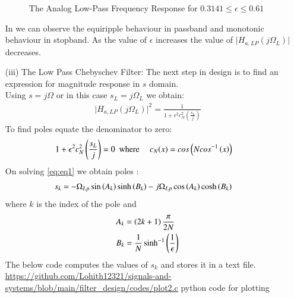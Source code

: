 \documentclass{article}
\begin{document}
\begin{itemize}
\begin{figure}[H]
\caption{The Analog Low-Pass Frequency Response for $0.3141  \leq \epsilon \leq 0.61$}
\label{fig:plot1}
\end{figure}
In  we can observe the equiripple behaviour in passband and monotonic behaviour in stopband. As the value of $\epsilon$ increases the value of $\vert H_{a,LP}(j\Omega_L)\vert$ decreases.\\
\item[(iii)] The Low Pass Chebyschev Filter: The next step in design is to find an expression for magnitude response in $s$ domain.\\
Using $s=j\Omega$ or in this case $s_{L}=j\Omega_{L}$ we obtain:
\begin{align}
    \vert H_{a,LP}(j\Omega_L)\vert^2 = \frac{1}{1 + \epsilon^2c_N^2(\frac{s_L}{j})}
\end{align}
To find poles equate the denominator to zero:
\begin{align}
    {1 + \epsilon^2c_N^2\ensuremath{\left(\frac{s_L}{j}\right)}} &=0\hspace{5pt }
    \text{where } \hspace{10pt} c_N(x) = cos\left(Ncos^{-1}\left(x\right)\right) \label{eq:eq1}
\end{align}
On solving \eqref{eq:eq1} we obtain poles :
\begin{align}
    s_{k} &= -\Omega_{Lp} \sin\left(A_k\right)\sinh\left(B_k\right) - j\Omega_{Lp}\cos\left(A_k\right)\cosh\left(B_k\right)
\end{align}
where $k$ is the index of the pole and \\
\begin{align}
    A_k &= \left(2k+1\right)\frac{\pi}{2N}\\
    B_k &= \frac{1}{N} \sinh^{-1}\left(\frac{1}{\epsilon}\right)
\end{align}
The below code computes the values of $s_k$ and stores it in a text file.\\
\href{https://github.com/Lohith12321/signals-and-systems/blob/main/filter_design/codes/plot2.c}{https://github.com/Lohith12321/signals-and-systems/blob/main/filter_design/codes/plot2.c}
python code for plotting\\


\end{itemize}
\end{document}
